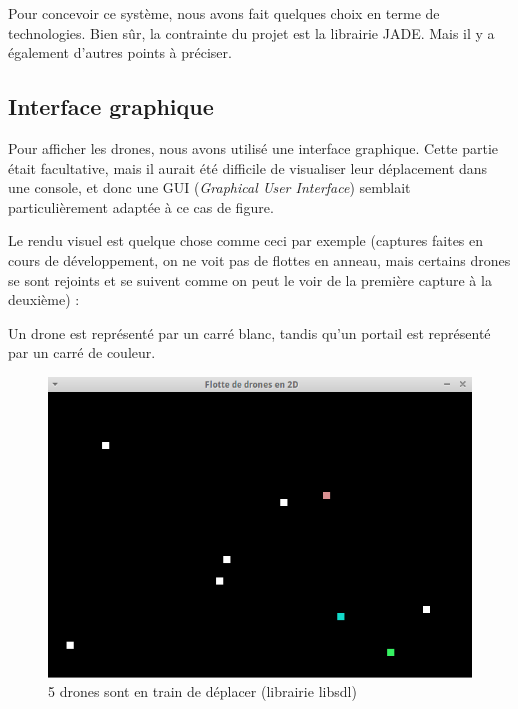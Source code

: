 \documentclass[11pt]{report}
\begin{document}
Pour concevoir ce système, nous avons fait quelques choix en terme de technologies. Bien sûr, la contrainte du projet est la librairie JADE. Mais il y a également d'autres points à préciser.

\subsection{Interface graphique}

Pour afficher les drones, nous avons utilisé une interface graphique. Cette partie était facultative, mais il aurait été difficile de visualiser leur déplacement dans une console, et donc une GUI (\textit{Graphical User Interface}) semblait particulièrement adaptée à ce cas de figure.

Le rendu visuel est quelque chose comme ceci par exemple (captures faites en cours de développement, on ne voit pas de flottes en anneau, mais certains drones se sont rejoints et se suivent comme on peut le voir de la première capture à la deuxième) :

Un drone est représenté par un carré blanc, tandis qu'un portail est représenté par un carré de couleur.

\begin{figure}[h]
\centering
\includegraphics[scale = 0.9]{img/flotte-3.png}
\caption{5 drones sont en train de déplacer (librairie libsdl)}
\end{figure}
\end{document}
